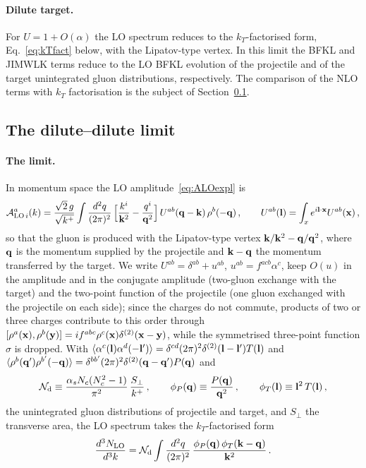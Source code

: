 \paragraph{Dilute target.} For $U=1+O(\alpha)$ the LO spectrum reduces to the $k_T$-factorised form, Eq.~\eqref{eq:kTfact} below, with the Lipatov-type vertex. In this limit the BFKL and JIMWLK terms reduce to the LO BFKL evolution of the projectile and of the target unintegrated gluon distributions, respectively. The comparison of the NLO terms with $k_T$ factorisation is the subject of Section~\ref{sec:check_dilute}.

\subsection{The dilute--dilute limit}\label{sec:check_dilute}

\paragraph{The limit.} In momentum space the LO amplitude~\eqref{eq:ALOexpl} is
\begin{align}\label{eq:ALOmom}
\mathcal A^{a}_{{\rm LO}\,i}(k)=\frac{\sqrt2\,g}{\sqrt{k^+}}\int\frac{d^2q}{(2\pi)^2}\,\Big[\frac{k^i}{\mathbf{k}^2}-\frac{q^i}{\mathbf{q}^2}\Big]\,U^{ab}(\mathbf{q}-\mathbf{k})\,\rho^b(-\mathbf{q})\,,\qquad
U^{ab}(\mathbf{l})=\int_xe^{i\mathbf{l}\cdot\mathbf{x}}U^{ab}(\mathbf{x})\,,
\end{align}
so that the gluon is produced with the Lipatov-type vertex $\mathbf{k}/\mathbf{k}^2-\mathbf{q}/\mathbf{q}^2$, where $\mathbf{q}$ is the momentum supplied by the projectile and $\mathbf{k}-\mathbf{q}$ the momentum transferred by the target. We write $U^{ab}=\delta^{ab}+u^{ab}$, $u^{ab}=f^{acb}\alpha^c$, keep $O(u)$ in the amplitude and in the conjugate amplitude (two-gluon exchange with the target) and the two-point function of the projectile (one gluon exchanged with the projectile on each side); since the charges do not commute, products of two or three charges contribute to this order through $[\rho^a(\mathbf{x}),\rho^b(\mathbf{y})]=if^{abc}\rho^c(\mathbf{x})\delta^{(2)}(\mathbf{x}-\mathbf{y})$, while the symmetrised three-point function $\sigma$ is dropped. With $\langle\alpha^c(\mathbf{l})\alpha^d(-\mathbf{l}')\rangle=\delta^{cd}(2\pi)^2\delta^{(2)}(\mathbf{l}-\mathbf{l}')T(\mathbf{l})$ and $\langle\rho^b(\mathbf{q}')\rho^{b'}(-\mathbf{q})\rangle=\delta^{bb'}(2\pi)^2\delta^{(2)}(\mathbf{q}-\mathbf{q}')P(\mathbf{q})$ and
\begin{align}\label{eq:dilute_not}
\mathcal N_{\rm d}\equiv\frac{\alpha_sN_c(N_c^2-1)}{\pi^2}\,\frac{S_\perp}{k^+}\,,\qquad\phi_P(\mathbf{q})\equiv\frac{P(\mathbf{q})}{\mathbf{q}^2}\,,\qquad\phi_T(\mathbf{l})\equiv\mathbf{l}^2\,T(\mathbf{l})\,,
\end{align}
the unintegrated gluon distributions of projectile and target, and $S_\perp$ the transverse area, the LO spectrum takes the $k_T$-factorised form~\cite{Gribov:1983ivg,Kovchegov:2001sc,Kharzeev:2003wz,Blaizot:2004wu}
\begin{align}\label{eq:kTfact}
\frac{d^3N_{\rm LO}}{d^3k}=\mathcal N_{\rm d}\int\frac{d^2q}{(2\pi)^2}\,\frac{\phi_P(\mathbf{q})\,\phi_T(\mathbf{k}-\mathbf{q})}{\mathbf{k}^2}\,.
\end{align}

